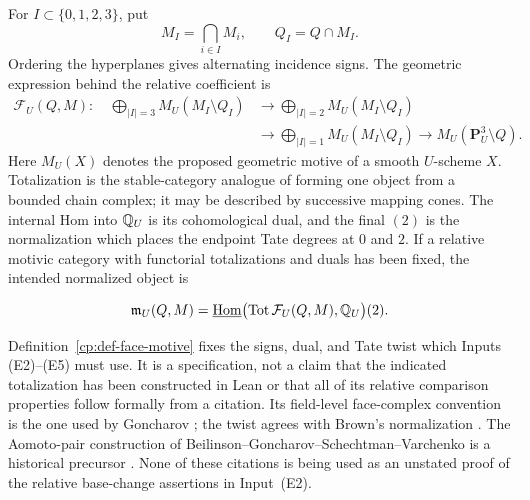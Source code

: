 For \(I\subset\{0,1,2,3\}\), put
\[
 M_I=\bigcap_{i\in I}M_i,\qquad Q_I=Q\cap M_I.
\]
Ordering the hyperplanes gives alternating incidence signs.  The geometric
expression behind the relative coefficient is
\begin{equation}
\begin{split}
 \mathcal F_U(Q,M):\quad
 \bigoplus_{|I|=3}M_U(M_I\setminus Q_I)
 &\longrightarrow
 \bigoplus_{|I|=2}M_U(M_I\setminus Q_I)\\
 &\longrightarrow
 \bigoplus_{|I|=1}M_U(M_I\setminus Q_I)
 \longrightarrow M_U(\mathbf P^3_U\setminus Q).
\end{split}
 \label{cp:eq-geometric-face-complex}
\end{equation}
Here \(M_U(X)\) denotes the proposed geometric motive of a smooth
\(U\)-scheme \(X\).  Totalization is the stable-category analogue of forming
one object from a bounded chain complex; it may be described by successive
mapping cones.  The internal Hom into \(\mathbb Q_U\) is its cohomological dual,
and the final \((2)\) is the normalization which places the endpoint Tate
degrees at \(0\) and \(2\).
If a relative motivic category with functorial totalizations and duals has
been fixed, the intended normalized object is
\begin{definition}
\label{cp:def-face-motive}
\begin{equation}
 \mathfrak m_U(Q,M)=
 \underline{\operatorname{Hom}}
 \bigl(\operatorname{Tot}\mathcal F_U(Q,M),
       \mathbb Q_U\bigr)(2).
 \label{cp:eq-normalized-relative-motive}
\end{equation}
\end{definition}

Definition~\ref{cp:def-face-motive} fixes the signs, dual, and Tate twist
which Inputs \textup{(E2)--(E5)} must use.  It is a specification, not a
claim that the indicated totalization has been constructed in Lean or that
all of its relative comparison properties follow formally from a citation.
Its field-level face-complex convention is the one used by Goncharov
\cite{Goncharov1999}; the twist agrees with Brown's normalization
\cite[Definition~5.8]{Brown2013}.  The Aomoto-pair construction of
Beilinson--Goncharov--Schechtman--Varchenko is a historical precursor
\cite{BGSV1990}.  None of these citations is being used as an unstated proof
of the relative base-change assertions in Input~\textup{(E2)}.

